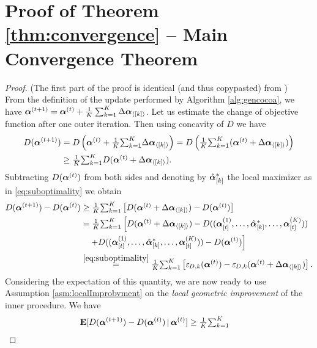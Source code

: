\newcommand{\vsub}[2]{#1_{\langle[#2]\rangle}}

\section{Proof of Theorem \ref{thm:convergence} -- Main Convergence Theorem}

\begin{proof}
(The first part of the proof is identical (and thus copypasted) from \cite{CoCoA})\\
From the definition of the update performed by Algorithm \ref{alg:gencocoa}, we have
$\av^{(t+1)}
  =
  \av^{(t)}
  + \frac{1}{K} \sum_{k=1}^K   \vsub{ \Delta \av }{k}$.
Let us estimate the change of objective function after one outer iteration.
  Then using concavity of $D$ we have
\begin{align*}
D(\av^{(t+1)})
 &=
 D\left(\av^{(t)}
  + \tfrac1K \textstyle{\sum}_{k=1}^K
      \vsub{\Delta \av}{k}
     \right)
  =
  D\left(\tfrac1K \textstyle{\sum}_{k=1}^K (
     \av^{(t)} + \vsub{\Delta \av}{k} )
        \right)
\\&\geq
 \tfrac1K \textstyle{\sum}_{k=1}^K D(
    \av^{(t)} + \vsub{\Delta \av}{k} ).
\end{align*}
Subtracting $D(\bm{\alpha}^{(t)})$ from both sides and denoting by
$\hat {\bm{\alpha}}^*_{[k]}$ the local maximizer as in \eqref{eq:suboptimality}
we obtain
\begin{align*}
D(\av^{(t+1)})-D(\av^{(t)})
 &\geq
 \tfrac1K \textstyle{\sum}_{k=1}^K
 \left[ D(
    \av^{(t)} + \vsub{\Delta \av}{k}
      )
    -D(\av^{(t)}) \right]
\\
 &=
 \tfrac1K \textstyle{\sum}_{k=1}^K
 \left[ D(
    \av^{(t)} + \vsub{\Delta \av}{k}
      )
      -D((\av_{[t]}^{(1)},\dots,\hat\av^*_{[k]},\dots,\av_{[t]}^{(K)}))
      \right.
      \\ &\quad \left.
      +D((\av_{[t]}^{(1)},\dots,\hat\av^*_{[k]},\dots,\av_{[t]}^{(K)}))
    -D(\av^{(t)}) \right]
\\
&\overset{\eqref{eq:suboptimality}}{=}
 \tfrac1K \textstyle{\sum}_{k=1}^K
 \left[
 \suboptlocal(\av^{(t)})
 - \suboptlocal(\av^{(t)}+   \Delta\vsub{\av}{k} )
 \right].
\end{align*}
Considering the expectation of this quantity, we are now ready to use Assumption \ref{asm:localImprobvment} on the \emph{local geometric improvement} of the inner procedure. We have
\begin{align*}
\E[D(\av^{(t+1)})-D(\av^{(t)})\,|\,\av^{(t)}]
 &\geq
 \tfrac1K \textstyle{\sum}_{k=1}^K

\end{align*}
\end{proof}
